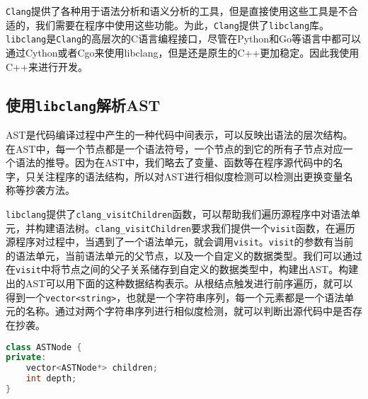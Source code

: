 \documentclass[UTF8]{ctexart}
\begin{document}
\texttt{Clang}提供了各种用于语法分析和语义分析的工具，但是直接使用这些工具是不合适的，我们需要在程序中使用这些功能。为此，\texttt{Clang}提供了\texttt{libclang}库。\texttt{libclang}是\texttt{Clang}的高层次的C语言编程接口，尽管在Python和Go等语言中都可以通过Cython或者Cgo来使用libclang，但是还是原生的C++更加稳定。因此我使用C++来进行开发。
\subsection{使用\texttt{libclang}解析AST}
AST是代码编译过程中产生的一种代码中间表示，可以反映出语法的层次结构。在AST中，每一个节点都是一个语法符号，一个节点的到它的所有子节点对应一个语法的推导。因为在AST中，我们略去了变量、函数等在程序源代码中的名字，只关注程序的语法结构，所以对AST进行相似度检测可以检测出更换变量名称等抄袭方法。

\texttt{libclang}提供了\texttt{clang\_visitChildren}函数，可以帮助我们遍历源程序中对语法单元，并构建语法树。\texttt{clang\_visitChildren}要求我们提供一个\texttt{visit}函数，在遍历源程序对过程中，当遇到了一个语法单元，就会调用\texttt{visit}。\texttt{visit}的参数有当前的语法单元，当前语法单元的父节点，以及一个自定义的数据类型。我们可以通过在\texttt{visit}中将节点之间的父子关系储存到自定义的数据类型中，构建出AST。构建出的AST可以用下面的这种数据结构表示。从根结点触发进行前序遍历，就可以得到一个\texttt{vector<string>}，也就是一个字符串序列，每一个元素都是一个语法单元的名称。通过对两个字符串序列进行相似度检测，就可以判断出源代码中是否存在抄袭。
\begin{lstlisting}[language=C++]
class ASTNode {
private:
    vector<ASTNode*> children;
    int depth;
}
\end{lstlisting}
\end{document}
